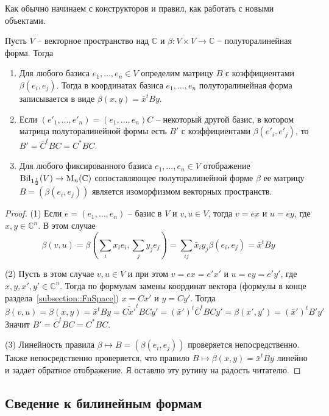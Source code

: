 Как обычно начинаем с конструкторов и правил, как работать с новыми объектами.

\begin{claim}
Пусть $V$ -- векторное пространство над $\mathbb C$ и $\beta \colon V\times V \to \mathbb C$ -- полуторалинейная форма.
Тогда
\begin{enumerate}
\item Для любого базиса $e_1,\ldots,e_n\in V$ определим матрицу $B$ с коэффициентами $\beta(e_i, e_j)$.
Тогда в координатах базиса $e_1,\ldots,e_n$ полуторалинейная форма записывается в виде $\beta(x, y) = \bar x^t B y$.

\item Если $(e'_1,\ldots,e'_n) = (e_1,\ldots,e_n)C$ -- некоторый другой базис, в котором матрица полуторалинейной формы есть $B'$ с коэффициентами $\beta(e'_i,e'_j)$, то $B' = \bar C^t B C = C^* B C$.

\item Для любого фиксированного базиса $e_1,\ldots,e_n\in V$ отображение $\operatorname{Bil}_{1\frac{1}{2}}(V)\to \operatorname{M}_n(\mathbb C)$ сопоставляющее полуторалинейной форме $\beta$ ее матрицу $B = (\beta(e_i,e_j))$ является изоморфизмом векторных пространств.
\end{enumerate}
\end{claim}
\begin{proof}
(1) Если $e = (e_1,\ldots,e_n)$ -- базис в $V$ и $v,u\in V$, тогда $v = ex$ и $u = ey$, где $x,y\in \mathbb C^n$.
В этом случае
\[
\beta(v,u) = \beta(\sum_i x_i e_i, \sum_j y_j e_j) = \sum_{ij}\bar x_i y_j \beta(e_i, e_j) = \bar x^t B y
\]

(2) Пусть в этом случае $v,u\in V$ и при этом $v = ex = e' x'$ и $u = ey = e'y'$, где $x,y,x',y'\in \mathbb C^n$.
Тогда по формулам замены координат вектора (формулы в конце раздела~\ref{subsection::FnSpace}) $x = Cx'$ и $y = Cy'$.
Тогда
\[
\beta(v,u) =\beta(x,y) = \bar x^t B y = \overline{Cx'}^t B C y' = (\bar x')^t \bar C^t B C y' = \beta(x',y') = (\bar x')^t B' y'
\]
Значит $B' = \bar C^t B C = C^* B C$.

(3) Линейность правила $\beta\mapsto B = (\beta(e_i, e_j))$ проверяется непосредственно.
Также непосредственно проверяется, что правило $B\mapsto \beta(x,y) = \bar x^t B y$ линейно и задает обратное отображение.
Я оставлю эту рутину на радость читателю.
\end{proof}


\subsection{Сведение к билинейным формам}

